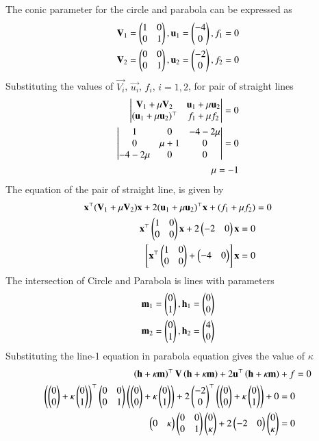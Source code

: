 \documentclass[journal]{IEEEtran}
\begin{document}
The conic parameter for the circle and parabola  can be expressed as 
\begin{align}
    \mathbf{V}_1 = \begin{pmatrix}1 & 0 \\ 0 & 1\end{pmatrix}, \mathbf{u}_1 = \begin{pmatrix}-4 \\ 0\end{pmatrix}, f_1 = 0 \\
    \mathbf{V}_2 = \begin{pmatrix}0 & 0 \\ 0 &1\end{pmatrix}, \mathbf{u}_2 = \begin{pmatrix}-2 \\ 0\end{pmatrix}, f_2 = 0
\end{align}
Substituting the values of $\vec{V_i}$, $\vec{u_i}$, $f_i$, $i = 1, 2$, for pair of straight lines\\
\begin{align}
 \begin{vmatrix}\mathbf{V}_1 + \mu\mathbf{V}_2 & \mathbf{u}_1 + \mu\mathbf{u}_2 \\ (\mathbf{u}_1+ \mu\mathbf{u}_2)^\top & f_1 + \mu f_2\end{vmatrix} = 0 \\
 \begin{vmatrix}1 & 0 & -4 -2\mu \\ 0 & \mu + 1 & 0 \\ -4-2\mu & 0 & 0\end{vmatrix} = 0   \\
 \mu = -1
\end{align}
The equation of the pair of straight line, is given by
\begin{align}
    \mathbf{x}^\top (\mathbf{V}_1+\mu\mathbf{V}_2)\mathbf{x}+2(\mathbf{u}_1 + \mu \mathbf{u}_2)^\top \mathbf{x} + (f_1 + \mu f_2) &= 0 \\
    \mathbf{x}^\top \begin{pmatrix}1 & 0 \\ 0 & 0\end{pmatrix}\mathbf{x}+2\begin{pmatrix}-2 & 0\end{pmatrix} \mathbf{x}   = 0 \\
	{}\left[\mathbf{x}^\top \begin{pmatrix}1 & 0 \\ 0 & 0\end{pmatrix} + \begin{pmatrix}-4 & 0\end{pmatrix}\right]\mathbf{x} = 0
\end{align}
The intersection of Circle and Parabola is lines with parameters
\begin{align}
\mathbf{m}_1 = \begin{pmatrix}0 \\ 1\end{pmatrix}, \mathbf{h}_1 = \begin{pmatrix}0 \\ 0\end{pmatrix} \\
\mathbf{m}_2 = \begin{pmatrix}0 \\ 1\end{pmatrix}, \mathbf{h}_2 = \begin{pmatrix}4 \\ 0\end{pmatrix}
\end{align}
Substituting the line-1 equation in parabola equation gives the value of $\kappa$
\begin{align}
\left(\mathbf{h}+\kappa\mathbf{m}\right)^\top\mathbf{V}\left(\mathbf{h}+\kappa\mathbf{m}\right) + 2\mathbf{u}^\top\left(\mathbf{h}+\kappa\mathbf{m}\right) + f &= 0 \\
\left(\begin{pmatrix}0 \\ 0\end{pmatrix} + \kappa \begin{pmatrix}0\\1\end{pmatrix}\right)^\top \begin{pmatrix} 0&0\\0&1\end{pmatrix}\left(\begin{pmatrix}0 \\ 0\end{pmatrix}+ \kappa \begin{pmatrix}0\\1\end{pmatrix}\right) + 2\begin{pmatrix}-2\\0\end{pmatrix}^\top \left(\begin{pmatrix}0 \\ 0\end{pmatrix} + \kappa \begin{pmatrix}0\\1\end{pmatrix}\right) + 0 = 0 \\
\begin{pmatrix}0 & \kappa\end{pmatrix}\begin{pmatrix}0 & 0 \\ 0 &1\end{pmatrix}\begin{pmatrix}0 \\ \kappa\end{pmatrix} + 2\begin{pmatrix}-2 & 0\end{pmatrix}\begin{pmatrix}0 \\ \kappa\end{pmatrix} = 0
\end{align}
\end{document}
